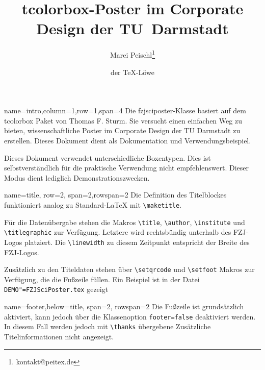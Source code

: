 \documentclass[
	accentcolor=9c,
	logofile=example-image, %
	]{fzjsciposter}
\newcommand{\tbs}{\textbackslash}
\let\code\texttt
\newcommand*{\macro}[1]{\code{\tbs#1}}
\let\file\texttt
\let\pck\textsf
\let\cls\textsf
\begin{document}
\title{\pck{tcolorbox}-Poster im Corporate Design der TU~Darmstadt}
\author{Marei Peischl\thanks{kontakt@peitex.de} \and der \TeX-Löwe}


\begin{tcbposter}[
	poster={
		columns=4,
		rows=7,
		spacing=1cm,
	},]
	
	\begin{posterboxenv}[title=Zusammenfassung]{name=intro,column=1,row=1,span=4}
	Die \cls{fzjsciposter}-Klasse basiert auf dem \pck{tcolorbox} Paket von Thomas F. Sturm.
	Sie versucht einen einfachen Weg zu bieten, wissenschaftliche Poster im Corporate Design der TU Darmstadt zu erstellen. Dieses Dokument dient als Dokumentation und Verwendungsbeispiel.
	
	Dieses Dokument verwendet unterschiedliche Boxentypen. Dies ist selbstverständlich für die praktische Verwendung nicht empfehlenswert. Dieser Modus dient lediglich Demonstrationszwecken.
	\end{posterboxenv}

	\begin{posterboxenv}[title=Titelei]{name=title, row=2, span=2,rowspan=2}
	Die Definition des Titelblockes funktioniert analog zu Standard-\LaTeX{} mit \macro{maketitle}.
	
	Für die Datenübergabe stehen die Makros \macro{title}, \macro{author}, \macro{institute} und \macro{titlegraphic} zur Verfügung. Letztere wird rechtsbündig  unterhalb des FZJ-Logos platziert. Die \macro{linewidth} zu diesem Zeitpunkt entspricht der Breite des FZJ-Logos.
	
	Zusätzlich zu den Titeldaten stehen über \macro{setqrcode} und \macro{setfoot} Makros zur Verfügung, die die Fußzeile füllen.
	Ein Beispiel ist in der Datei \file{DEMO"=FZJSciPoster.tex} gezeigt
	\end{posterboxenv}

\begin{posterboxenv}[title=Fußzeile]{name=footer,below=title, span=2, rowspan=2 }
	Die Fußzeile ist grundsätzlich aktiviert, kann jedoch über die Klassenoption \code{footer=false} deaktiviert werden. In diesem Fall werden jedoch mit \macro{thanks} übergebene Zusätzliche Titelinformationen nicht angezeigt.
	

\end{posterboxenv}
\end{tcbposter}
\end{document}
